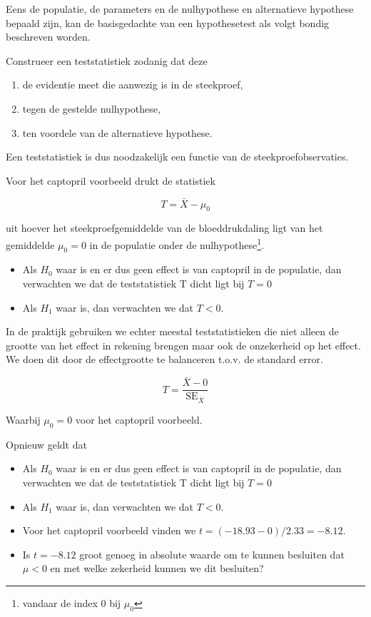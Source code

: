 \documentclass[
  12pt,dutch,coursenotes]{book}
\providecommand{\tightlist}{%
  \setlength{\itemsep}{0pt}\setlength{\parskip}{0pt}}
\theoremstyle{definition}
\theoremstyle{definition}
\theoremstyle{definition}
\theoremstyle{definition}
\theoremstyle{remark}
\begin{document}
Eens de populatie, de parameters en de nulhypothese en alternatieve hypothese bepaald zijn, kan de basisgedachte van een hypothesetest als volgt bondig beschreven worden.

Construeer een teststatistiek zodanig dat deze

\begin{enumerate}
\def\labelenumi{\arabic{enumi}.}
\tightlist
\item
  de evidentie meet die aanwezig is in de steekproef,
\item
  tegen de gestelde nulhypothese,
\item
  ten voordele van de alternatieve hypothese.
\end{enumerate}

Een teststatistiek is dus noodzakelijk een functie van de steekproefobservaties.

Voor het captopril voorbeeld drukt de statistiek

\[T=\bar X - \mu_0\]

uit hoever het steekproefgemiddelde van de bloeddrukdaling ligt van het gemiddelde \(\mu_0=0\) in de populatie onder de nulhypothese\footnote{vandaar de index 0 bij \(\mu_0\)}.

\begin{itemize}
\tightlist
\item
  Als \(H_0\) waar is en er dus geen effect is van captopril in de populatie, dan verwachten we dat de teststatistiek T dicht ligt bij \(T=0\)
\item
  Als \(H_1\) waar is, dan verwachten we dat \(T<0\).
\end{itemize}

In de praktijk gebruiken we echter meestal teststatistieken die niet alleen de grootte van het effect in rekening brengen maar ook de onzekerheid op het effect.
We doen dit door de effectgrootte te balanceren t.o.v. de standard error.

\[T=\frac{\bar{X}-0}{\text{SE}_{\bar X}}\]

Waarbij \(\mu_0=0\) voor het captopril voorbeeld.

Opnieuw geldt dat

\begin{itemize}
\tightlist
\item
  Als \(H_0\) waar is en er dus geen effect is van captopril in de populatie, dan verwachten we dat de teststatistiek T dicht ligt bij \(T=0\)
\item
  Als \(H_1\) waar is, dan verwachten we dat \(T<0\).
\item
  Voor het captopril voorbeeld vinden we \(t=(-18.93-0)/2.33=-8.12\).
\item
  Is \(t = -8.12\) groot genoeg in absolute waarde om te kunnen besluiten dat \(\mu < 0\) en met welke zekerheid kunnen we dit besluiten?
\end{itemize}
\end{document}
